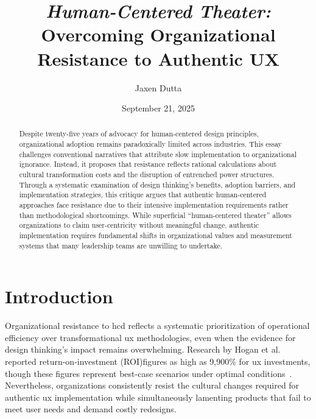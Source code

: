 \documentclass[11pt,showkeys]{../../shared/essay}
\begin{document}
\title{\textit{Human-Centered Theater:}\\
Overcoming Organizational Resistance to Authentic UX}

\author{Jaxen Dutta}

\date{September 21, 2025}

\begin{abstract}
Despite twenty-five years of advocacy for human-centered design principles, organizational adoption remains paradoxically limited across industries. This essay challenges conventional narratives that attribute slow implementation to organizational ignorance. Instead, it proposes that resistance reflects rational calculations about cultural transformation costs and the disruption of entrenched power structures. Through a systematic examination of design thinking's benefits, adoption barriers, and implementation strategies, this critique argues that authentic human-centered approaches face resistance due to their intensive implementation requirements rather than methodological shortcomings. While superficial ``human-centered theater'' allows organizations to claim user-centricity without meaningful change, authentic implementation requires fundamental shifts in organizational values and measurement systems that many leadership teams are unwilling to undertake.
\end{abstract}


\maketitle

\section{Introduction}

Organizational resistance to \gls{hcd} reflects a systematic prioritization of operational efficiency over transformational \gls{ux} methodologies, even when the evidence for design thinking's impact remains overwhelming. Research by Hogan et al. reported return-on-investment (ROI)figures as high as 9,900\% for \gls{ux} investments, though these figures represent best-case scenarios under optimal conditions~\cite{hogan2016}. Nevertheless, organizations consistently resist the cultural changes required for authentic \gls{ux} implementation while simultaneously lamenting products that fail to meet user needs and demand costly redesigns.
\end{document}

